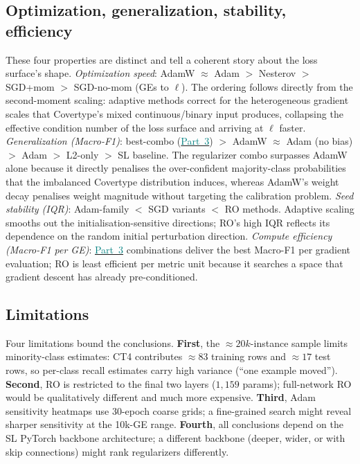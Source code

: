 \documentclass[conference]{IEEEtran}
\newcommand{\partref}[2]{\hyperref[#2]{\textcolor{teal}{Part~#1}}}
\begin{document}
\subsection{Optimization, generalization, stability, efficiency}\label{sec:disc:ogse}
These four properties are distinct and tell a coherent story about the
loss surface's shape.
\textit{Optimization speed}: AdamW $\approx$ Adam $>$ Nesterov $>$ SGD+mom
$>$ SGD-no-mom (GEs to $\ell$).
The ordering follows directly from the second-moment scaling: adaptive methods
correct for the heterogeneous gradient scales that Covertype's mixed
continuous/binary input produces, collapsing the effective condition number
of the loss surface and arriving at $\ell$ faster.
\textit{Generalization (Macro-F1)}: best-combo (\partref{3}{sec:p3}) $>$ AdamW $\approx$
Adam (no bias) $>$ Adam $>$ L2-only $>$ SL baseline.
The regularizer combo surpasses AdamW alone because it directly penalises
the over-confident majority-class probabilities that the imbalanced
Covertype distribution induces, whereas AdamW's weight decay penalises
weight magnitude without targeting the calibration problem.
\textit{Seed stability (IQR)}: Adam-family $<$ SGD variants $<$ RO methods.
Adaptive scaling smooths out the initialisation-sensitive directions; RO's
high IQR reflects its dependence on the random initial perturbation direction.
\textit{Compute efficiency (Macro-F1 per GE)}: \partref{3}{sec:p3} combinations deliver
the best Macro-F1 per gradient evaluation; RO is least efficient per metric
unit because it searches a space that gradient descent has already
pre-conditioned.

\subsection{Limitations}\label{sec:disc:limits}
Four limitations bound the conclusions.
\textbf{First}, the $\approx 20k$-instance sample limits minority-class estimates:
CT4 contributes $\approx 83$ training rows and $\approx 17$ test rows, so
per-class recall estimates carry high variance (``one example moved'').
\textbf{Second}, RO is restricted to the final two layers ($1{,}159$ params);
full-network RO would be qualitatively different and much more expensive.
\textbf{Third}, Adam sensitivity heatmaps use 30-epoch coarse grids; a
fine-grained search might reveal sharper sensitivity at the 10k-GE range.
\textbf{Fourth}, all conclusions depend on the SL PyTorch backbone
architecture; a different backbone (deeper, wider, or with skip connections)
might rank regularizers differently.
\end{document}
